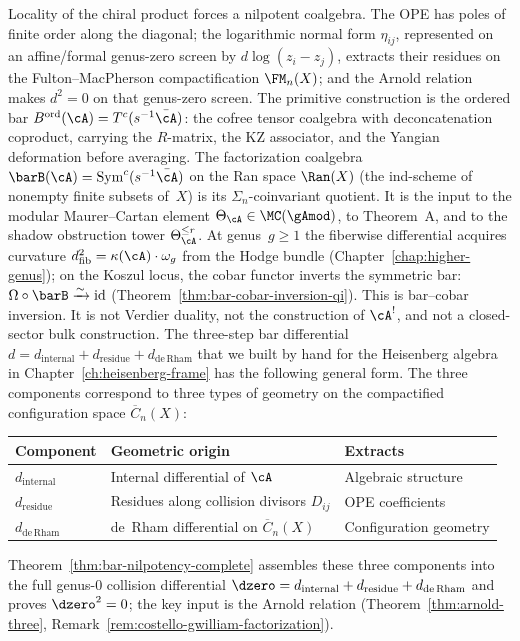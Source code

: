 Locality of the chiral product forces a nilpotent coalgebra.
The OPE has poles of finite order along the diagonal; the logarithmic
normal form \(\eta_{ij}\), represented on an affine/formal genus-zero
screen by \(d\log(z_i-z_j)\), extracts their residues on the
Fulton--MacPherson compactification \(\FM_n(X)\); and the Arnold
relation makes \(d^2=0\) on that genus-zero screen.
The primitive construction is the ordered bar
$B^{\mathrm{ord}}(\cA) = T^c(s^{-1}\bar\cA)$: the cofree
tensor coalgebra with deconcatenation coproduct, carrying the
$R$-matrix, the KZ associator, and the Yangian deformation before
averaging. The factorization coalgebra
$\barB(\cA)=\mathrm{Sym}^c(s^{-1}\bar\cA)$ on the Ran space
$\Ran(X)$ (the ind-scheme of nonempty finite subsets of~$X$)
is its $\Sigma_n$-coinvariant quotient. It is the input to the
modular Maurer--Cartan element
$\Theta_\cA \in \MC(\gAmod)$, to Theorem~A, and to the shadow
obstruction tower $\Theta_\cA^{\leq r}$.
At genus~$g \geq 1$ the fiberwise differential acquires curvature
$d^2_{\mathrm{fib}} = \kappa(\cA) \cdot \omega_g$ from the Hodge bundle
(Chapter~\ref{chap:higher-genus}); on the Koszul locus, the cobar
functor inverts the symmetric bar:
$\Omega \circ \barB \xrightarrow{\sim} \mathrm{id}$
(Theorem~\ref{thm:bar-cobar-inversion-qi}). This is bar--cobar
inversion. It is not Verdier duality, not the construction of
$\cA^!$, and not a closed-sector bulk construction.
The three-step bar differential
$d = d_{\mathrm{internal}} + d_{\mathrm{residue}}
+ d_{\mathrm{de\,Rham}}$ that we built by hand for the Heisenberg
algebra in Chapter~\ref{ch:heisenberg-frame} has the following general
form. The three components
correspond to three types of geometry on the compactified
configuration space $\overline{C}_n(X)$:
\begin{center}
\small
\begin{tabular}{lll}
\textbf{Component} & \textbf{Geometric origin} & \textbf{Extracts} \\
\hline
$d_{\mathrm{internal}}$ & Internal differential of $\cA$ & Algebraic structure \\
$d_{\mathrm{residue}}$ & Residues along collision divisors $D_{ij}$ & OPE coefficients \\
$d_{\mathrm{de\,Rham}}$ & de~Rham differential on $\overline{C}_n(X)$ & Configuration geometry
\end{tabular}
\end{center}

\noindent
Theorem~\ref{thm:bar-nilpotency-complete} assembles these three
components into the full genus-$0$ collision differential
$\dzero = d_{\mathrm{internal}} + d_{\mathrm{residue}} + d_{\mathrm{de\,Rham}}$
and proves $\dzero^2 = 0$; the key input is the Arnold relation
(Theorem~\ref{thm:arnold-three},
Remark~\ref{rem:costello-gwilliam-factorization}).

